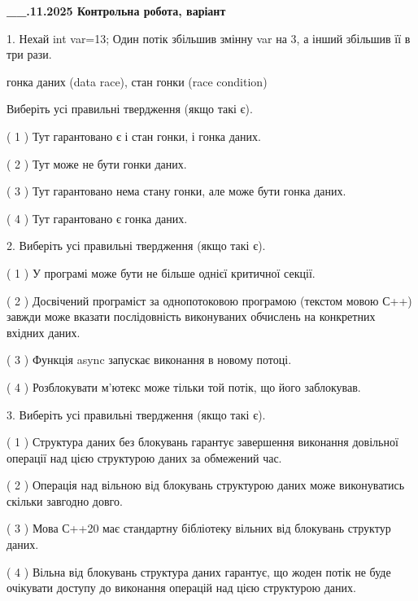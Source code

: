 \documentclass[12pt, ukrainian]{article}
\begin{document}
\newpage
\begin {large}

\textbf{\_\_.11.2025 Контрольна робота, варіант  }\par


{
1. Нехай int var=13; Один потік збільшив змінну var на 3, а інший збільшив її в три рази.

гонка даних (data race), стан гонки (race condition)

Виберіть усі правильні твердження (якщо такі є).\par
\vspace{2mm}
( 1 ) Тут гарантовано є і стан гонки, і гонка даних.%

( 2 ) Тут може не бути гонки даних.%

( 3 ) Тут гарантовано нема стану гонки, але може бути гонка даних.%

( 4 ) Тут гарантовано є гонка даних.%


2. Виберіть усі правильні твердження (якщо такі є).\par
\vspace{2mm}

( 1 ) У програмі може бути не більше однієї критичної секції.%

( 2 ) Досвічений програміст за однопотоковою програмою (текстом мовою С++) завжди може вказати послідовність виконуваних обчислень на конкретних вхідних даних.%

( 3 ) Функція async запускає виконання в новому потоці.%

( 4 ) Розблокувати м’ютекс може тільки той потік, що його заблокував.%


3. Виберіть усі правильні твердження (якщо такі є).\par
\vspace{2mm}

( 1 ) Структура даних без блокувань гарантує завершення виконання довільної операції над цією структурою даних за обмежений час.%

( 2 ) Операція над вільною від блокувань структурою даних може виконуватись скільки завгодно довго.%

( 3 ) Мова С++20 має стандартну бібліотеку вільних від блокувань структур даних.%

( 4 ) Вільна від блокувань структура даних гарантує, що жоден потік не буде очікувати доступу до виконання операцій над цією структурою даних.%


}
\end{large}
\end{document}
